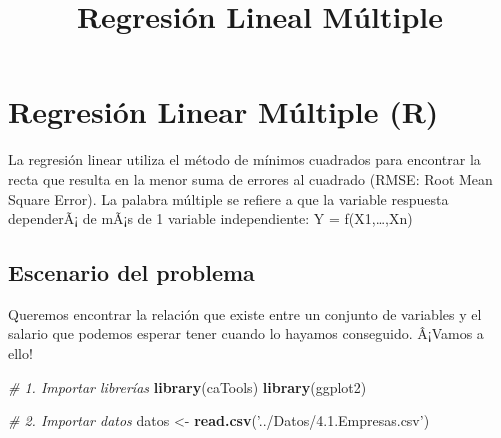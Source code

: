 \documentclass[]{article}
\title{Regresión Lineal Múltiple}
\author{}
\date{}
\newenvironment{Shaded}{\begin{snugshade}}{\end{snugshade}}
\newcommand{\KeywordTok}[1]{\textcolor[rgb]{0.13,0.29,0.53}{\textbf{#1}}}
\newcommand{\DataTypeTok}[1]{\textcolor[rgb]{0.13,0.29,0.53}{#1}}
\newcommand{\DecValTok}[1]{\textcolor[rgb]{0.00,0.00,0.81}{#1}}
\newcommand{\StringTok}[1]{\textcolor[rgb]{0.31,0.60,0.02}{#1}}
\newcommand{\CommentTok}[1]{\textcolor[rgb]{0.56,0.35,0.01}{\textit{#1}}}
\newcommand{\OperatorTok}[1]{\textcolor[rgb]{0.81,0.36,0.00}{\textbf{#1}}}
\newcommand{\NormalTok}[1]{#1}
\begin{document}
\maketitle

\section{Regresión Linear Múltiple
(R)}\label{regresion-linear-multiple-r}

La regresión linear utiliza el método de mínimos cuadrados para
encontrar la recta que resulta en la menor suma de errores al cuadrado
(RMSE: Root Mean Square Error). La palabra múltiple se refiere a que la
variable respuesta dependerÃ¡ de mÃ¡s de 1 variable independiente: Y =
f(X1,\ldots{},Xn)

\subsection{Escenario del problema}\label{escenario-del-problema}

 Queremos encontrar la relación que existe entre un conjunto de
variables y el salario que podemos esperar tener cuando lo hayamos
conseguido. Â¡Vamos a ello!

\begin{Shaded}
\begin{Highlighting}[]
\CommentTok{# 1. Importar librerías}
\KeywordTok{library}\NormalTok{(caTools)}
\KeywordTok{library}\NormalTok{(ggplot2)}
\end{Highlighting}
\end{Shaded}

\begin{Shaded}
\begin{Highlighting}[]
\CommentTok{# 2. Importar datos}
\NormalTok{datos <-}\StringTok{ }\KeywordTok{read.csv}\NormalTok{(}\StringTok{'../Datos/4.1.Empresas.csv'}\NormalTok{)}
\end{Highlighting}
\end{Shaded}

\begin{Shaded}
\end{Shaded}
\end{document}
